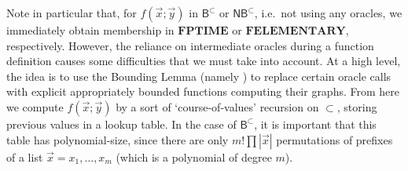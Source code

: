 \documentclass[manuscript,screen]{acmart}
\theoremstyle{definition}
\theoremstyle{remark}
\newcommand{\permpref}{\subset}
\newcommand{\ptime}{\mathbf{PTIME}}
\newcommand{\elementary}{\mathbf{ELEMENTARY}}
\newcommand{\f}{\mathbf{F}}
\newcommand{\fptime}{\f\ptime}
\newcommand{\felementary}{\f\elementary}
\newcommand{\bc}{\mathsf{B}}
\newcommand{\bcwfpo}[1]{\bc^{#1}}
\newcommand{\nested}{\mathsf{N}}
\newcommand{\nbcwfpo}[1]{\nested\bcwfpo{#1}}
\newcommand{\bcpp}{\bcwfpo{\permpref}}
\newcommand{\nbcpp}{\nbcwfpo{\permpref}}
\begin{document}
Note in particular that, for $f(\vec x;\vec y)$ in $\bcpp$ or $\nbcpp$, i.e.\ not using any oracles, we immediately obtain membership in $\fptime$ or $\felementary$, respectively.
However, the reliance on intermediate oracles during a function definition causes some difficulties that we must take into account.
At a high level, the idea is to use the Bounding Lemma   (namely ) to replace certain oracle calls with explicit appropriately bounded functions computing their graphs. 
From here we compute $f(\vec x;\vec y)$ by a sort of `course-of-values' recursion on $\permpref$, storing previous values in a lookup table.
In the case of $\bcpp$, it is important that this table has polynomial-size, since there are only $m! \prod |\vec x|$ permutations of prefixes of a list $\vec x= x_1, \dots, x_m$ (which is a polynomial of degree $m$).
\end{document}
